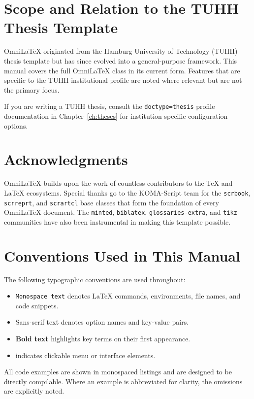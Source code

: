 \section{Scope and Relation to the TUHH Thesis Template}

OmniLaTeX originated from the Hamburg University of Technology (TUHH) thesis
template but has since evolved into a general-purpose framework.  This manual
covers the full OmniLaTeX class in its current form.  Features that are
specific to the TUHH institutional profile are noted where relevant but are not
the primary focus.

If you are writing a TUHH thesis, consult the \texttt{doctype=thesis} profile
documentation in Chapter~\ref{ch:theses} for institution-specific configuration
options.

\section{Acknowledgments}

OmniLaTeX builds upon the work of countless contributors to the \TeX{} and
\LaTeX{} ecosystems.  Special thanks go to the KOMA-Script team for the
\texttt{scrbook}, \texttt{scrreprt}, and \texttt{scrartcl} base classes that
form the foundation of every OmniLaTeX document.  The \texttt{minted},
\texttt{biblatex}, \texttt{glossaries-extra}, and \texttt{tikz} communities
have also been instrumental in making this template possible.

\section{Conventions Used in This Manual}

The following typographic conventions are used throughout:

\begin{itemize}
    \item \texttt{Monospace text} denotes \LaTeX{} commands, environments,
          file names, and code snippets.
    \item \textsf{Sans-serif text} denotes option names and key-value pairs.
    \item \textbf{Bold text} highlights key terms on their first appearance.
    \item {} indicates clickable menu or interface elements.
\end{itemize}

All code examples are shown in monospaced listings and are designed to be
directly compilable.  Where an example is abbreviated for clarity, the
omissions are explicitly noted.

